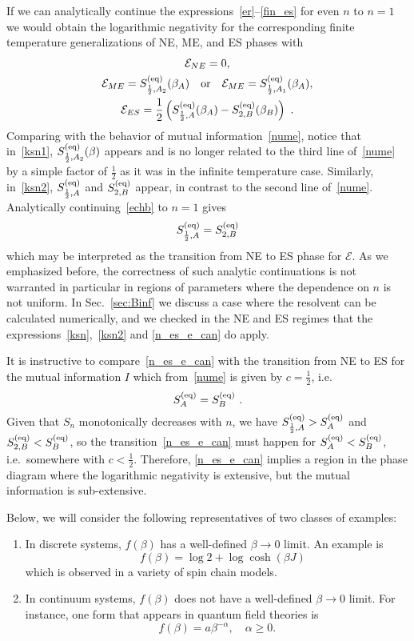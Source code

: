 \documentclass[a4paper,11pt]{article}
\newcommand\half{{\ensuremath{\frac{1}{2}}}}
\newcommand{\be}{\begin{equation}}
\newcommand{\ee}{\end{equation}}
\newcommand{\bega}{\begin{gather}}
\def\b{{\beta}}
\newcommand\ov{\over}
\newcommand\ha{{\half}}
\def\le{\left}
\def\ri{\right}
\newcommand\sE{{\ensuremath{{\mathcal E}}}}
\begin{document}
If we can analytically continue the expressions~\eqref{er}--\eqref{fin_es} for even $n$ to $n =1$ we would obtain the logarithmic negativity for the corresponding finite temperature generalizations of NE, ME, and ES phases with 
\bega \label{ksn}
\sE_{NE} = 0 , \\
\label{ksn1}
\sE_{ME} = S_{\ha, A_2}^{\rm (eq)} (\b_A) \quad \text{or} \quad \sE_{ME} = S_{\ha, A_1}^{\rm (eq)} (\b_A) , \\
\sE_{ES} = \ha \le(S^{\rm (eq)}_{{1 \ov 2}, A}(\beta_A) - S_{2, B}^{\rm (eq)}(\beta_B) \ri) \ .
\label{ksn2} 
\end{gather} 
Comparing with the behavior of mutual information~\eqref{nume}, notice that in~\eqref{ksn1}, $S^{(\rm eq)}_{{1 \ov 2}, A_2} (\b) $ appears and is no longer related to the third line of~\eqref{nume} by a simple factor of $\ha$ as it was in the infinite temperature case. 
Similarly, in~\eqref{ksn2}, $S^{(\rm eq)}_{\ha , A}$ and $S^{(\rm eq)}_{2,B}$ appear, in contrast to the second line of~\eqref{nume}.
Analytically continuing~\eqref{echb} to $n=1$ gives 
\be 
S_{\frac{1}{2}, A}^{\rm (eq)} = S^{\rm (eq)}_{2, B} 
\label{n_es_e_can}
\ee 
which may be interpreted as the transition from NE to ES phase for $\sE$. 
As we emphasized before, the correctness of such analytic continuations is not warranted in particular in regions of parameters where the dependence on $n$ is not uniform. 
In Sec.~\ref{sec:Binf} we discuss a case where the resolvent can be calculated numerically, and we checked in the NE and ES regimes that the expressions~\eqref{ksn},~\eqref{ksn2} and \eqref{n_es_e_can} do apply. 

It is instructive to compare~\eqref{n_es_e_can} with the transition from NE to ES for the mutual information $I$ which from~\eqref{nume} is given by $c = \ha$, i.e.~
\be 
S_{A}^{\rm (eq)} = S^{\rm (eq)}_{B} \ . \label{mutual_ne_es}
\ee
Given that $S_n$ monotonically decreases with $n$, we have $S_{\frac{1}{2}, A}^{\rm (eq)} > S_{A}^{\rm (eq)} $
and $S^{\rm (eq)}_{2, B} < S^{\rm (eq)}_{B} $, so the transition~\eqref{n_es_e_can} must happen for
$S_{A}^{\rm (eq)} < S^{\rm (eq)}_{B} $, i.e.~somewhere with $c < \ha$. Therefore, \eqref{n_es_e_can} implies a region in the phase diagram where the logarithmic negativity is extensive, but the mutual information is sub-extensive. 

Below, we will consider the following representatives of two classes of examples:
\begin{enumerate} 
\item 
In discrete systems, $f(\beta)$ has a well-defined $\beta\rightarrow 0$ limit. An example is 
\be 
 \quad f(\beta) = \log 2 + \log\cosh(\beta J) \label{example_disc} 
\ee
which is observed in a variety of spin chain models. %
\item 
In continuum systems, $f(\beta)$ does not have a well-defined $\beta \rightarrow 0$ limit. For instance, one form that appears in quantum field theories is 
\be 
f(\beta) = a \beta^{-\alpha}, \quad \alpha \geq 0. \label{example_cont}
\ee
\end{enumerate}
\end{document}
